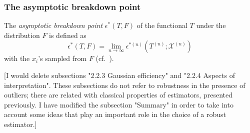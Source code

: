 

\subsubsection{The asymptotic breakdown point}

The \emph{asymptotic breakdown point} $\epsilon^*(T, F)$ of the functional
$T$ under the distribution $F$ is defined as
\[
    \epsilon^*(T, F) = \lim_{n\rightarrow\infty} \epsilon^{*(n)}(T^{(n)}; \mathcal{X}^{(n)})
\]
with the $x_i$'s sampled from $F$ (cf.\ \citealp{hampel:1971}).


\alert{[I would delete subsections "2.2.3 Gaussian efficiency" and "2.2.4
Aspects of interpretation". These subsections do not refer to robustness in the
presence of outliers; there are related with classical properties of
estimators, presented previously. I have modified the subsection "Summary" in
order to take into account some ideas that play an important role in the choice
of a robust estimator.]}






